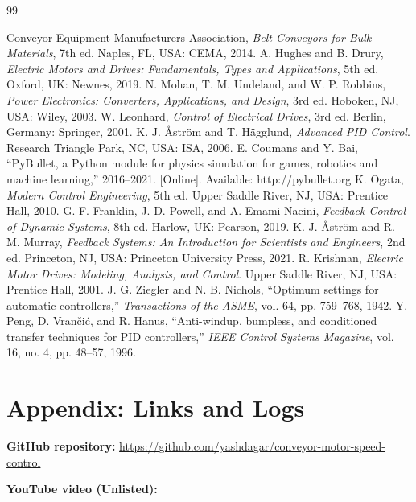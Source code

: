 \documentclass[12pt,a4paper]{article}
\begin{document}
\begin{thebibliography}{99}
 Conveyor Equipment Manufacturers Association, \textit{Belt Conveyors for Bulk Materials}, 7th ed. Naples, FL, USA: CEMA, 2014.
 A. Hughes and B. Drury, \textit{Electric Motors and Drives: Fundamentals, Types and Applications}, 5th ed. Oxford, UK: Newnes, 2019.
 N. Mohan, T. M. Undeland, and W. P. Robbins, \textit{Power Electronics: Converters, Applications, and Design}, 3rd ed. Hoboken, NJ, USA: Wiley, 2003.
 W. Leonhard, \textit{Control of Electrical Drives}, 3rd ed. Berlin, Germany: Springer, 2001.
 K. J. Åström and T. Hägglund, \textit{Advanced PID Control}. Research Triangle Park, NC, USA: ISA, 2006.
 E. Coumans and Y. Bai, ``PyBullet, a Python module for physics simulation for games, robotics and machine learning,'' 2016--2021. [Online]. Available: http://pybullet.org
 K. Ogata, \textit{Modern Control Engineering}, 5th ed. Upper Saddle River, NJ, USA: Prentice Hall, 2010.
 G. F. Franklin, J. D. Powell, and A. Emami-Naeini, \textit{Feedback Control of Dynamic Systems}, 8th ed. Harlow, UK: Pearson, 2019.
 K. J. Åström and R. M. Murray, \textit{Feedback Systems: An Introduction for Scientists and Engineers}, 2nd ed. Princeton, NJ, USA: Princeton University Press, 2021.
 R. Krishnan, \textit{Electric Motor Drives: Modeling, Analysis, and Control}. Upper Saddle River, NJ, USA: Prentice Hall, 2001.
 J. G. Ziegler and N. B. Nichols, ``Optimum settings for automatic controllers,'' \textit{Transactions of the ASME}, vol. 64, pp. 759--768, 1942.
 Y. Peng, D. Vrančić, and R. Hanus, ``Anti-windup, bumpless, and conditioned transfer techniques for PID controllers,'' \textit{IEEE Control Systems Magazine}, vol. 16, no. 4, pp. 48--57, 1996.
\end{thebibliography}

\clearpage
\section*{Appendix: Links and Logs}

\textbf{GitHub repository:} \url{https://github.com/yashdagar/conveyor-motor-speed-control}

\textbf{YouTube video (Unlisted):} \underline{\hspace{8cm}}
\end{document}
